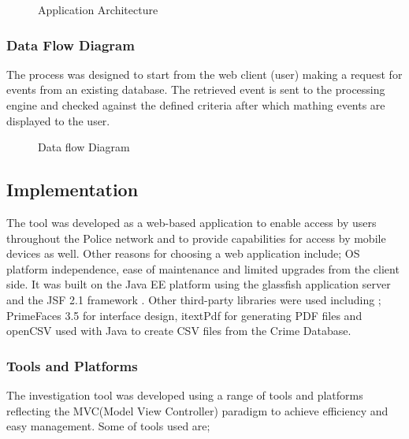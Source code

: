 \begin{center}
\begin{figure}[h]
\caption{Application Architecture}

\end{figure}
\end{center}

\subsubsection{Data Flow Diagram}

\noindent The process was designed to start from the web client (user) making a request for events from an existing database. The retrieved event is sent to the processing engine and checked against the defined criteria after which mathing events are displayed to the user.

\begin{center}
\begin{figure}[h]
\caption{Data flow Diagram}

\end{figure}
\end{center}

\subsection{Implementation}

\noindent The tool was developed as a web-based application to enable access by users throughout the Police network and to provide capabilities for access by mobile devices as well. Other reasons for choosing a web application include; OS platform independence, ease of maintenance and limited upgrades from the client side. It was built on the Java EE platform using the glassfish application server and the JSF 2.1 framework \cite{twentythree}. Other third-party libraries were used including ; PrimeFaces 3.5 \cite{twentyfour} for interface design, itextPdf for generating PDF files and openCSV used with Java to create CSV files from the Crime Database.


\subsubsection{Tools and Platforms}

\noindent The investigation tool was developed using a range of tools and platforms  reflecting  the MVC(Model View Controller) paradigm  to achieve efficiency and easy management. Some of tools used are;

